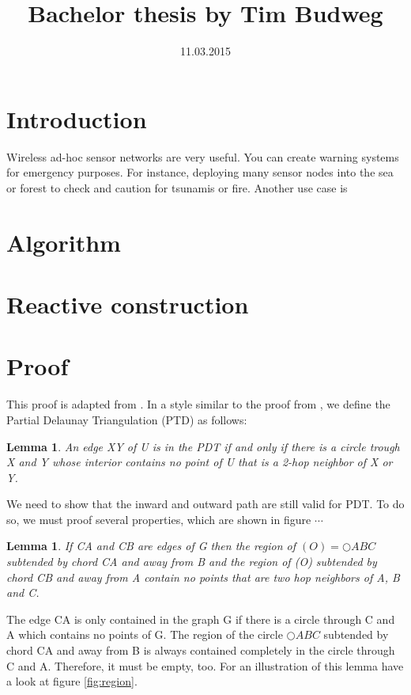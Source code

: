 \documentclass[a4paper,twoside, onecolumn]{IEEEtran}
\title{Bachelor thesis by Tim Budweg}
\author{}
\date{11.03.2015}
\newtheorem{emptycircle}{Lemma}[section]
\newtheorem{emptyregion}{Lemma}[section]
\begin{document}
\maketitle

\section{Introduction}
Wireless ad-hoc sensor networks are very useful. 
You can create warning systems for emergency purposes.
For instance, deploying many sensor nodes into the sea or forest to check and caution for tsunamis or fire.
Another use case is
\section{Algorithm}
\section{Reactive construction}
\section{Proof}
This proof is adapted from \cite{kanj}.
In a style similar to the proof from \cite{kanj}, we define the Partial Delaunay Triangulation (PTD) as follows:
\begin{emptycircle}
\label{emptycircle}
An edge XY of U is in the PDT if and only if there is a circle trough X and Y whose interior contains no point of U that is a 2-hop neighbor of X or Y.
\end{emptycircle}
We need to show that the inward and outward path are still valid for PDT.
To do so, we must proof several properties, which are shown in figure $\cdots $

\begin{emptyregion}
If CA and CB are edges of G then the region of $(O)=\bigcirc{ABC} $ subtended by chord  CA and away from B and the region of (O) subtended by chord CB and away from A contain no points that are two hop neighbors of A, B and C.
\end{emptyregion}

The edge CA is only contained in the graph G if there is a circle through C and A which contains no points of G.
The region of the circle $\bigcirc{ABC} $ subtended by chord CA and away from B is always contained completely in the circle through C and A.
Therefore, it must be empty, too.
For an illustration of this lemma have a look at figure \ref{fig:region}.
\end{document}
